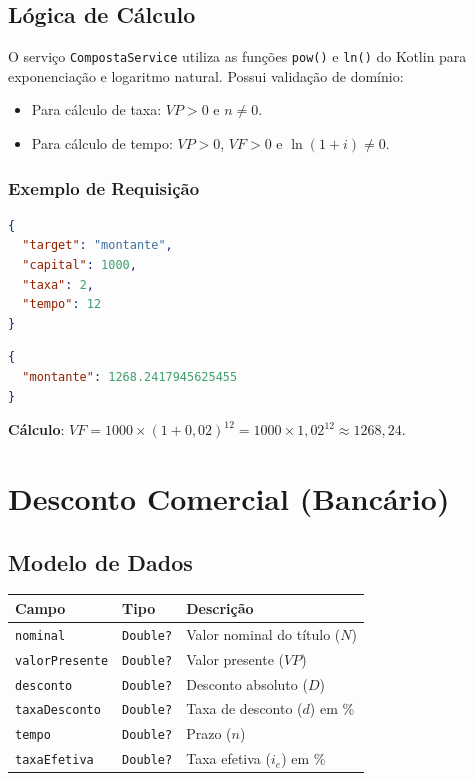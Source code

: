 \documentclass[12pt,a4paper]{article}
\begin{document}
\subsection{Lógica de Cálculo}

O serviço \texttt{CompostaService} utiliza as funções \texttt{pow()} e \texttt{ln()} do Kotlin para exponenciação e logaritmo natural. Possui validação de domínio:
\begin{itemize}
  \item Para cálculo de taxa: $VP > 0$ e $n \neq 0$.
  \item Para cálculo de tempo: $VP > 0$, $VF > 0$ e $\ln(1 + i) \neq 0$.
\end{itemize}

\subsubsection{Exemplo de Requisição}

\begin{lstlisting}[language=json,title={POST /api/composta/calculate}]
{
  "target": "montante",
  "capital": 1000,
  "taxa": 2,
  "tempo": 12
}
\end{lstlisting}

\begin{lstlisting}[language=json,title={Resposta}]
{
  "montante": 1268.2417945625455
}
\end{lstlisting}

\textbf{Cálculo}: $VF = 1000 \times (1 + 0{,}02)^{12} = 1000 \times 1{,}02^{12} \approx 1268{,}24$.

\section{Desconto Comercial (Bancário)}
\label{sec:desconto}

\subsection{Modelo de Dados}

\begin{center}
\begin{tabular}{llp{6.5cm}}
  \toprule
  \textbf{Campo} & \textbf{Tipo} & \textbf{Descrição} \\
  \midrule
  \texttt{nominal}       & \texttt{Double?} & Valor nominal do título ($N$) \\
  \texttt{valorPresente} & \texttt{Double?} & Valor presente ($VP$) \\
  \texttt{desconto}      & \texttt{Double?} & Desconto absoluto ($D$) \\
  \texttt{taxaDesconto}  & \texttt{Double?} & Taxa de desconto ($d$) em \% \\
  \texttt{tempo}         & \texttt{Double?} & Prazo ($n$) \\
  \texttt{taxaEfetiva}   & \texttt{Double?} & Taxa efetiva ($i_e$) em \% \\
  \bottomrule
\end{tabular}
\end{center}
\end{document}

